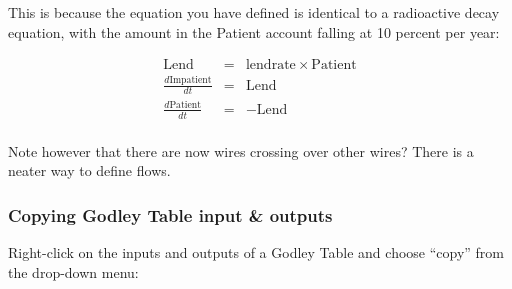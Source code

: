 \begin{center}
\end{center}

This is because the equation you have defined is identical to a
radioactive decay equation, with the amount in the Patient account
falling at 10 percent per year:

\begin{eqnarray*}
\mathrm{Lend}&=&\mathrm{lendrate}\times\mathrm{Patient}\\
\frac{d\mathrm{Impatient}}{dt}&=&\mathrm{Lend}\\
\frac{d\mathrm{Patient}}{dt}&=&-\mathrm{Lend}\\
\end{eqnarray*}

Note however that there are now wires crossing over other wires? There
is a neater way to define flows. 

\subsubsection{Copying Godley Table input \& outputs}

Right-click on the inputs and outputs of a Godley Table and choose
``copy'' from the drop-down menu:

